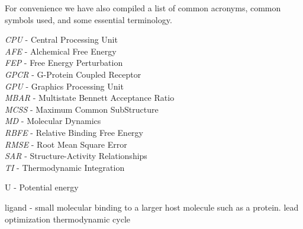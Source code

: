\documentclass[9pt,bestpractices]{livecoms}
\begin{document}
For convenience we have also compiled a list of common acronyms, common symbols used, and some essential terminology.
\begin{tcolorbox}[title=Acronyms, colback=blue!10!white]
    \textit{CPU} - Central Processing Unit\\
    \textit{AFE} - Alchemical Free Energy\\
    \textit{FEP} - Free Energy Perturbation\\
    \textit{GPCR} - G-Protein Coupled Receptor\\
    \textit{GPU} - Graphics Processing Unit\\
    \textit{MBAR} - Multistate Bennett Acceptance Ratio\\
    \textit{MCSS} - Maximum Common SubStructure\\
    \textit{MD} - Molecular Dynamics\\
    \textit{RBFE} - Relative Binding Free Energy\\
    \textit{RMSE} - Root Mean Square Error\\
    \textit{SAR} - Structure-Activity Relationships\\
    \textit{TI} - Thermodynamic Integration
\end{tcolorbox}
\begin{tcolorbox}[title=List of Symbols, colback=green!10!white]
U - Potential energy
\end{tcolorbox}

\begin{tcolorbox}[title=Common terminology, colback=green!10!white]
    ligand - small molecular binding to a larger host molecule such as a protein. 
    lead optimization
    thermodynamic cycle
\end{tcolorbox}

\end{document}
